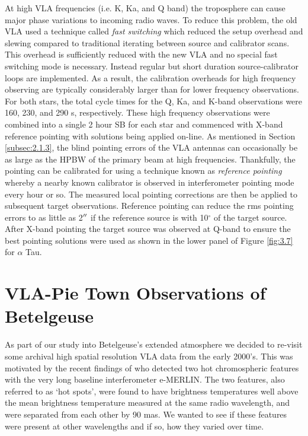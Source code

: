 At high VLA frequencies (i.e. K, Ka, and Q band) the troposphere can cause major phase variations to incoming radio waves. To reduce this problem, the old VLA used a technique called \textit{fast switching} which reduced the setup overhead and slewing compared to traditional iterating between source and calibrator scans. This overhead is sufficiently reduced with the new VLA and no special fast switching mode is necessary. Instead regular but short duration source-calibrator loops are implemented. As a result, the calibration overheads for high frequency observing are typically considerably larger than for lower frequency observations. For both stars, the total cycle times for the Q, Ka, and K-band observations were 160, 230, and 290 s, respectively. These high frequency observations were combined into a single 2 hour SB for each star and commenced with X-band reference pointing with solutions being applied on-line. As mentioned in Section \ref{subsec:2.1.3}, the blind pointing errors of the VLA antennas can occasionally be as large as the HPBW of the primary beam at high frequencies. Thankfully, the pointing can be calibrated for using a technique known as \textit{reference pointing} whereby a nearby known calibrator is observed in interferometer pointing mode every hour or so. The measured local pointing corrections are then be applied to subsequent target observations. Reference pointing can reduce the rms pointing errors to as little as 2$^{\prime\prime}$ if the reference source is with 10$^\circ$ of the target source. After X-band pointing the target source was observed at Q-band to ensure the best pointing solutions were used as shown in the lower panel of Figure \ref{fig:3.7} for $\alpha$ Tau.  

\section{VLA-Pie Town Observations of Betelgeuse}\label{sec:3.7}

As part of our study into Betelgeuse's extended atmosphere we decided to re-visit some archival high spatial resolution VLA data from the early 2000's. This was motivated by the recent findings of \cite{richards_2013} who detected two hot chromospheric features  with the very long baseline interferometer e-MERLIN. The two features, also referred to as `hot spots', were found to have brightness temperatures well above the mean brightness temperature measured at the same radio wavelength, and were separated from each other by 90 mas. We wanted to see if these features were present at other wavelengths and if so, how they varied over time.

